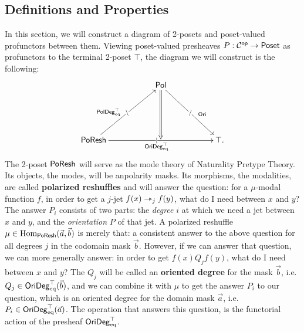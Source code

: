 \documentclass[a4paper]{memoir}
\begin{document}
\subsection{Definitions and Properties} \label{sec:poresh:def}
In this section, we will construct a diagram of 2-posets and poset-valued profunctors between them.
Viewing poset-valued presheaves $P : {\mathcal{C}}^{\mathsf{op}} \to {\mathsf{Poset}}$ as profunctors to the terminal 2-poset $\top$, the diagram we will construct is the following:
\[
	\xymatrix{
		&& \polcat
			\ar[rrdd]|{/}^(.6){\oripsh}
			\ar@{=>}[dd]
		\\ \\
		\poreshcat
			\ar[rruu]|{\setminus}^(.4){\poldegeqtop}
			\ar[rrrr]|{|}_{\oridegeqtop}
		&&&&
		\top.
	}
\]
The 2-poset $\mathsf{PoResh}$ will serve as the mode theory of Naturality Pretype Theory.
Its objects, the modes, will be anpolarity masks.
Its morphisms, the modalities, are called \textbf{polarized reshuffles} and will answer the question: for a $\mu$-modal function $f$, in order to get a $j$-jet $f(x) \rightarrowtriangle_j f(y)$, what do I need between $x$ and $y$?
The answer $P_i$ consists of two parts: the \emph{degree} $i$ at which we need a jet between $x$ and $y$, and the \emph{orientation} $P$ of that jet.
A polarized reshuffle $\mu \in {\mathrm{Hom}}_{\mathsf{PoResh}}(\vec a, \vec b)$ is merely that: a consistent answer to the above question for all degrees $j$ in the codomain mask $\vec b$.
However, if we can answer that question, we can more generally answer: in order to get $f(x) \mathrel{Q_j} f(y)$, what do I need between $x$ and $y$?
The $Q_j$ will be called an \textbf{oriented degree} for the mask $\vec b$, i.e. $Q_j \in \mathsf{OriDeg}_{\mathrm{eq}}^\top(\vec b)$, and we can combine it with $\mu$ to get the answer $P_i$ to our question, which is an oriented degree for the domain mask $\vec a$, i.e.\ $P_i \in \mathsf{OriDeg}_{\mathrm{eq}}^\top(\vec a)$.
The operation that answers this question, is the functorial action of the presheaf $\mathsf{OriDeg}_{\mathrm{eq}}^\top$.
\end{document}
